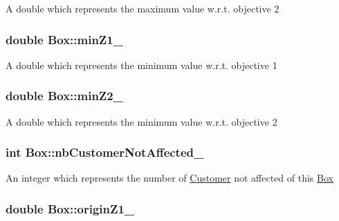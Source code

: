 \-A double which represents the maximum value w.\-r.\-t. objective 2 \hypertarget{classBox_ac2054bd31949983a7d02a5229b9aa505}{
\subsubsection[{min\-Z1\-\_\-}]{\setlength{\rightskip}{0pt plus 5cm}double {\bf \-Box\-::min\-Z1\-\_\-}}}\label{classBox_ac2054bd31949983a7d02a5229b9aa505}
\-A double which represents the minimum value w.\-r.\-t. objective 1 \hypertarget{classBox_a79cb036404755c024cb2ec38c2d6f51e}{
\subsubsection[{min\-Z2\-\_\-}]{\setlength{\rightskip}{0pt plus 5cm}double {\bf \-Box\-::min\-Z2\-\_\-}}}\label{classBox_a79cb036404755c024cb2ec38c2d6f51e}
\-A double which represents the minimum value w.\-r.\-t. objective 2 \hypertarget{classBox_a9b4fe28d0a913cee7c6126b5283f6073}{
\subsubsection[{nb\-Customer\-Not\-Affected\-\_\-}]{\setlength{\rightskip}{0pt plus 5cm}int {\bf \-Box\-::nb\-Customer\-Not\-Affected\-\_\-}}}\label{classBox_a9b4fe28d0a913cee7c6126b5283f6073}
\-An integer which represents the number of {\ttfamily \hyperlink{classCustomer}{\-Customer}} not affected of this {\ttfamily \hyperlink{classBox}{\-Box}} \hypertarget{classBox_ad9dd1c25f765a4b055e61b98fca017a7}{
\subsubsection[{origin\-Z1\-\_\-}]{\setlength{\rightskip}{0pt plus 5cm}double {\bf \-Box\-::origin\-Z1\-\_\-}}}\label{classBox_ad9dd1c25f765a4b055e61b98fca017a7}
